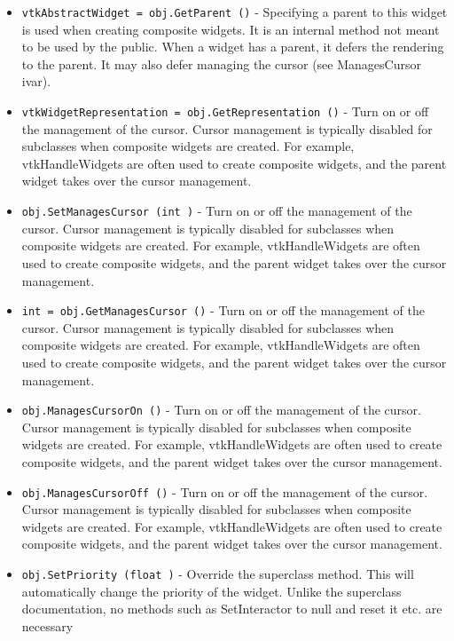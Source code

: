\begin{itemize}
\item  \verb|vtkAbstractWidget = obj.GetParent ()| -  Specifying a parent to this widget is used when creating composite
 widgets. It is an internal method not meant to be used by the public.
 When a widget has a parent, it defers the rendering to the parent. It
 may also defer managing the cursor (see ManagesCursor ivar).

\item  \verb|vtkWidgetRepresentation = obj.GetRepresentation ()| -  Turn on or off the management of the cursor. Cursor management is
 typically disabled for subclasses when composite widgets are
 created. For example, vtkHandleWidgets are often used to create
 composite widgets, and the parent widget takes over the cursor
 management.

\item  \verb|obj.SetManagesCursor (int )| -  Turn on or off the management of the cursor. Cursor management is
 typically disabled for subclasses when composite widgets are
 created. For example, vtkHandleWidgets are often used to create
 composite widgets, and the parent widget takes over the cursor
 management.

\item  \verb|int = obj.GetManagesCursor ()| -  Turn on or off the management of the cursor. Cursor management is
 typically disabled for subclasses when composite widgets are
 created. For example, vtkHandleWidgets are often used to create
 composite widgets, and the parent widget takes over the cursor
 management.

\item  \verb|obj.ManagesCursorOn ()| -  Turn on or off the management of the cursor. Cursor management is
 typically disabled for subclasses when composite widgets are
 created. For example, vtkHandleWidgets are often used to create
 composite widgets, and the parent widget takes over the cursor
 management.

\item  \verb|obj.ManagesCursorOff ()| -  Turn on or off the management of the cursor. Cursor management is
 typically disabled for subclasses when composite widgets are
 created. For example, vtkHandleWidgets are often used to create
 composite widgets, and the parent widget takes over the cursor
 management.

\item  \verb|obj.SetPriority (float )| -  Override the superclass method. This will automatically change the
 priority of the widget. Unlike the superclass documentation, no 
 methods such as SetInteractor to null and reset it etc. are necessary

\end{itemize}
